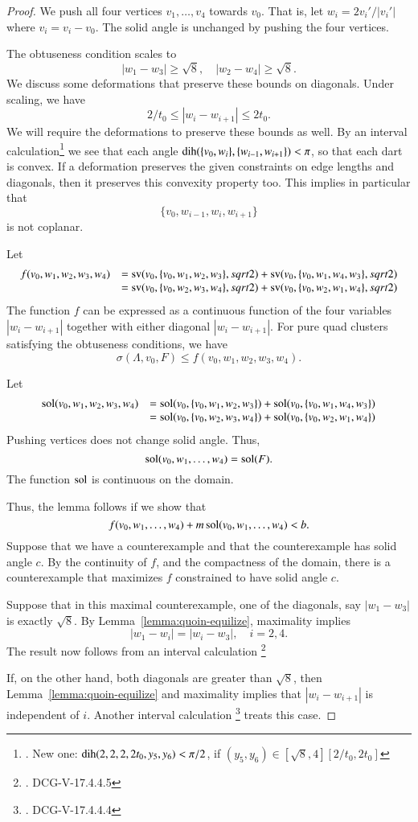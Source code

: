 \begin{proof}
We push all four vertices $v_1,\ldots,v_4$ towards $v_0$.
That is, let $w_i = 2 v_i'/|v_i'|$ where $v_i = v_i-v_0$.
The solid angle is unchanged by pushing the four vertices.

The obtuseness condition scales to
   $$|w_1-w_3|\ge \sqrt8,\quad |w_2-w_4|\ge \sqrt8.$$
We discuss some deformations that preserve these bounds on diagonals.
Under scaling, we have
   $$2/t_0 \le |w_i - w_{i+1}|\le 2t_0.$$
We will require the deformations to preserve these bounds as well.
By an interval calculation\footnote{. New one:
$\operatorname{dih}(2,2,2,2t_0,y_5,y_6) < \pi/2$, if $(y_5,y_6)\in[\sqrt8,4][2/t_0,2t_0]$}
we see that each angle $\operatorname{dih}(\{v_0,w_i\},\{w_{i-1},w_{i+1}\}) < \pi$, so
that each dart is convex.  If a deformation preserves the given
constraints on edge lengths and diagonals, then it preserves this
convexity property too.  This implies in particular that
$$\{v_0,w_{i-1},w_i,w_{i+1}\}$$
is not coplanar.

Let 
$$
  \begin{array}{lll}
  f(v_0,w_1,w_2,w_3,w_4) &= {\operatorname{sv}}(v_0,\{v_0,w_1,w_2,w_3\},sqrt2) +
    {\operatorname{sv}}(v_0,\{v_0,w_1,w_4,w_3\},sqrt2) \\
  &= {\operatorname{sv}}(v_0,\{v_0,w_2,w_3,w_4\},sqrt2) +
    {\operatorname{sv}}(v_0,\{v_0,w_2,w_1,w_4\},sqrt2) \\
  \end{array}
$$
The function $f$ can be expressed as a continuous function
of the four variables $|w_i-w_{i+1}|$ together with either diagonal
$|w_i-w_{i+1}|$.
For pure quad clusters satisfying the obtuseness conditions, 
we have 
$$\sigma(\Lambda,v_0,F) \le f(v_0,w_1,w_2,w_3,w_4).$$

Let
$$
  \begin{array}{lll}
  \operatorname{sol}(v_0,w_1,w_2,w_3,w_4) &= \operatorname{sol}(v_0,\{v_0,w_1,w_2,w_3\}) +
    \operatorname{sol}(v_0,\{v_0,w_1,w_4,w_3\}) \\
  &= \operatorname{sol}(v_0,\{v_0,w_2,w_3,w_4\}) +
    \operatorname{sol}(v_0,\{v_0,w_2,w_1,w_4\}) \\
  \end{array}
$$
Pushing vertices does not change solid angle.  Thus,
$$
\operatorname{sol}(v_0,w_1,\ldots,w_4) = \operatorname{sol}(F).
$$
The function $\operatorname{sol}$ is continuous on the domain.

Thus, the lemma follows if we show that
$$f(v_0,w_1,\ldots,w_4) + m \operatorname{sol}(v_0,w_1,\ldots,w_4) < b.$$
Suppose that we have a counterexample and that the counterexample
has solid angle $c$.  By the continuity of $f$, and the compactness
of the domain, there is a counterexample that maximizes $f$ constrained
to have solid angle $c$.  

Suppose that in this maximal counterexample, one of the diagonals, say 
$|w_1-w_3|$ is exactly $\sqrt8$.  
By Lemma~\ref{lemma:quoin-equilize}, maximality implies
$$
|w_1-w_i|=|w_i-w_3|,\quad i=2,4.
$$
The result now follows from an interval calculation%
\footnote{. DCG-V-17.4.4.5}

If, on the other hand, both diagonals are greater than $\sqrt8$, then
Lemma~\ref{lemma:quoin-equilize} and maximality implies that
$|w_i-w_{i+1}|$ is independent of $i$.  Another interval
calculation%
\footnote{. DCG-V-17.4.4.4}
treats this case.
\end{proof}

